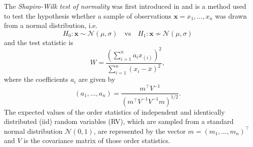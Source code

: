 

The \textit{Shapiro-Wilk test of normality} was first introduced in \cite{shapiro1965analysis} and is a method used to test the hypothesis whether a sample of observations $ \bm{x} = x_1, \ldots, x_n$ was drawn from a normal distribution, i.e.
\begin{equation}
H_0: \bm{x} \sim \mathcal{N}(\mu, \sigma) \quad \text{vs} \quad H_1: \bm{x} \nsim \mathcal{N}(\mu, \sigma)
\end{equation}
and the test statistic is
\begin{equation}
W=\frac{\left(\sum\limits_{i=1}^{n} a_{i} x_{(i)}\right)^{2}}{\sum\limits_{i=1}^{n}\left(x_{i}-\bar{x}\right)^{2}},
\end{equation}
where the coefficients $a_i$ are given by 
\begin{equation}
\left(a_{1}, \ldots, a_{n}\right)=\frac{m^{\top} V^{-1}}{\left(m^{\top} V^{-1} V^{-1} m\right)^{1 / 2}}.
\end{equation}
The expected values of the order statistics of independent and identically distributed (iid) random variables (RV), which are sampled from a standard normal distribution $\mathcal{N}(0,1)$, are represented by the vector $m=\left(m_{1}, \dots, m_{n}\right)^{\top}$ and $V$ is the covariance matrix of those order statistics.


















